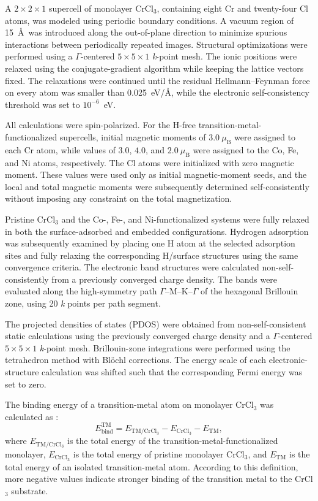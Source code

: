 \documentclass[journal=jacsat,manuscript=article]{achemso}
\begin{document}
A $2 \times 2 \times 1$ supercell of monolayer CrCl$_3$, containing eight Cr and twenty-four Cl atoms, was modeled using periodic boundary conditions. A vacuum region of 15~\AA\ was introduced along the out-of-plane direction to minimize spurious interactions between periodically repeated images. Structural optimizations were performed using a $\Gamma$-centered $5 \times 5 \times 1$ \textit{k}-point mesh. The ionic positions were relaxed using the conjugate-gradient algorithm while keeping the lattice vectors fixed. The relaxations were continued until the residual Hellmann--Feynman force on every atom was smaller than 0.025~eV/\AA, while the electronic self-consistency threshold was set to $10^{-6}$~eV.

All calculations were spin-polarized. For the H-free transition-metal-functionalized supercells, initial magnetic moments of $3.0~\mu_{\mathrm{B}}$ were assigned to each Cr atom, while values of $3.0$, $4.0$, and $2.0~\mu_{\mathrm{B}}$ were assigned to the Co, Fe, and Ni atoms, respectively. The Cl atoms were initialized with zero magnetic moment. These values were used only as initial magnetic-moment seeds, and the local and total magnetic moments were subsequently determined self-consistently without imposing any constraint on the total magnetization.

Pristine CrCl$_3$ and the Co-, Fe-, and Ni-functionalized systems were fully relaxed in both the surface-adsorbed and embedded configurations. Hydrogen adsorption was subsequently examined by placing one H atom at the selected adsorption sites and fully relaxing the corresponding H/surface structures using the same convergence criteria. The electronic band structures were calculated non-self-consistently from a previously converged charge density. The bands were evaluated along the high-symmetry path $\Gamma$--M--K--$\Gamma$ of the hexagonal Brillouin zone, using 20 \textit{k} points per path segment.

The projected densities of states (PDOS) were obtained from non-self-consistent static calculations using the previously converged charge density and a $\Gamma$-centered $5 \times 5 \times 1$ \textit{k}-point mesh. Brillouin-zone integrations were performed using the tetrahedron method with Blöchl corrections. The energy scale of each electronic-structure calculation was shifted such that the corresponding Fermi energy was set to zero.

The binding energy of a transition-metal atom on monolayer CrCl$_3$ was calculated as \cite{Liao2022,Sholl2009DensityTheory,Martin2004ElectronicMethods}:
\begin{equation}
    E_{\mathrm{bind}}^{\mathrm{TM}}
    =
    E_{\mathrm{TM/CrCl_3}}
    -
    E_{\mathrm{CrCl_3}}
    -
    E_{\mathrm{TM}},
    \label{eq:TM_binding}
\end{equation}
where $E_{\mathrm{TM/CrCl_3}}$ is the total energy of the transition-metal-functionalized monolayer, $E_{\mathrm{CrCl_3}}$ is the total energy of pristine monolayer CrCl$_3$, and $E_{\mathrm{TM}}$ is the total energy of an isolated transition-metal atom. According to this definition, more negative values indicate stronger binding of the transition metal to the CrCl$_3$ substrate.
\end{document}
